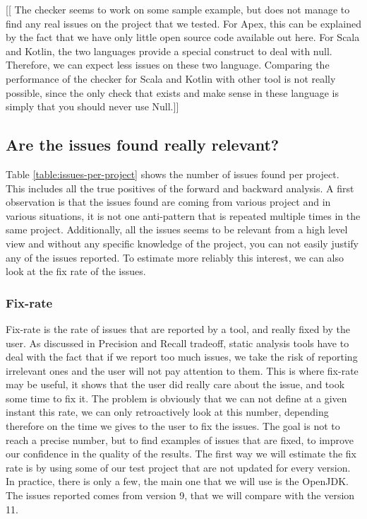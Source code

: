 [[ The checker seems to work on some sample example, but does not manage to find any real issues on the project that we tested. For Apex, this can be explained by the fact that we have only little open source code available out here. For Scala and Kotlin, the two languages provide a special construct to deal with null. Therefore, we can expect less issues on these two language. Comparing the performance of the checker for Scala and Kotlin with other tool is not really possible, since the only check that exists and make sense in these language is simply that you should never use Null.]]

\subsection{Are the issues found really relevant?}
\label{subsec:are_the_issues_relevant}

Table \ref{table:issues-per-project} shows the number of issues found per project. 
This includes all the true positives of the forward and backward analysis. 
A first observation is that the issues found are coming from various project and in various situations, it is not one anti-pattern that is repeated multiple times in the same project. Additionally, all the issues seems to be relevant from a high level view and without any specific knowledge of the project, you can not easily justify any of the issues reported. 
To estimate more reliably this interest, we can also look at the fix rate of the issues.

\subsubsection{Fix-rate}
\label{subsubsec:fix_rate}

Fix-rate is the rate of issues that are reported by a tool, and really fixed by the user. 
As discussed in Precision and Recall tradeoff, static analysis tools have to deal with the fact that if we report too much issues, we take the risk of reporting irrelevant ones and the user will not pay attention to them. 
This is where fix-rate may be useful, it shows that the user did really care about the issue, and took some time to fix it. \newline
The problem is obviously that we can not define at a given instant this rate, we can only retroactively look at this number, depending therefore on the time we gives to the user to fix the issues.
The goal is not to reach a precise number, but to find examples of issues that are fixed, to improve our confidence in the quality of the results.\newline
The first way we will estimate the fix rate is by using some of our test project that are not updated for every version. 
In practice, there is only a few, the main one that we will use is the OpenJDK. 
The issues reported comes from version 9, that we will compare with the version 11.

